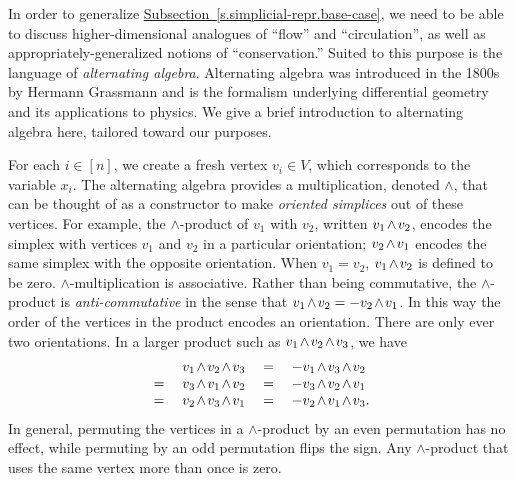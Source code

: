 \documentclass[11pt]{article}
\numberwithin{equation}{section}
\theoremstyle{definition}
\theoremstyle{plain}
\newcommand{\expref}[2]{\hyperref[#2]{#1~\ref{#2}}}
\newcommand{\wedgec}{\raisebox{-0.1pt}{\hskip 1pt{\tiny $\wedge$}\hskip 1pt}}
\newcommand{\Vertices}{\ensuremath{V}}
\begin{document}
In order to generalize \expref{Subsection}{s.simplicial-repr.base-case},
we need to be able to discuss higher-dimensional analogues of ``flow''
and ``circulation'',
as well as appropriately-generalized notions of ``conservation.''
Suited to this purpose is the language of \emph{alternating algebra}.
Alternating algebra was introduced in the 1800s by Hermann Grassmann
\cite{Grassmann1844,GrassmannKannenberg2000} and is the formalism
underlying differential geometry and its applications to physics.
We give a brief introduction to alternating algebra here,
tailored toward our purposes.

For each \(i\in [n]\), we create a fresh vertex $v_i \in \Vertices$, 
which corresponds to the variable $x_i$.
The alternating algebra provides a multiplication, denoted \(\wedge\),
that can be thought of as a constructor to make \emph{oriented simplices}
out of these vertices.
For example, the \(\wedge\)-product of \(v_1\) with \(v_2\),
written \(v_1\wedgec v_2\), encodes the simplex with vertices
\(v_1\) and \(v_2\) in a particular orientation; \(v_2\wedgec v_1\) encodes the same simplex with the opposite orientation. 
When \(v_1=v_2\), \(v_1\wedgec v_2\) is defined to be zero.
\(\wedge\)-multiplication is associative.
Rather than being commutative,
the \(\wedge\)-product is \emph{anti-commutative} in the sense that
\(v_1\wedgec v_2=-v_2\wedgec v_1\).
In this way the order of the vertices in the product encodes
an orientation.
There are only ever two orientations.
In a larger product such as
\(v_1\wedgec v_2\wedgec v_3\),
we have
\[\begin{array}{crcl}
      &\;   v_1\wedgec v_2\wedgec v_3
  \;&=&\; - v_1\wedgec v_3\wedgec v_2 \\
  \; =&\;   v_3\wedgec v_1\wedgec v_2
  \;&=&\; - v_3\wedgec v_2\wedgec v_1 \\
  \; =&\;   v_2\wedgec v_3\wedgec v_1
  \;&=&\; - v_2\wedgec v_1\wedgec v_3.
\end{array}\]
In general, permuting the vertices in a \(\wedge\)-product by an
even permutation has no effect,
while permuting by an odd permutation flips the sign.
Any \(\wedge\)-product that uses the same vertex more than once is
zero.
\end{document}
